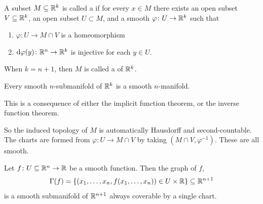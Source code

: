 \begin{definition}
A subset $M\subseteq\mathbb{R}^{k}$ is called a 
if for every $x\in M$ there exists an open subset $V\subseteq\mathbb{R}^{k}$,
an open subset $U\subset M$, and a smooth $\varphi\colon U\to\mathbb{R}^{k}$
such that
\begin{enumerate}
\item $\varphi\colon U\to M\cap V$ is a homeomorphism
\item $\mathrm{d}\varphi(y)\colon\mathbb{R}^{n}\to\mathbb{R}^{k}$ is injective for each
  $y\in U$.
\end{enumerate}
When $k=n+1$, then $M$ is called a  of $\mathbb{R}^{k}$.
\end{definition}

\begin{proposition}
Every smooth $n$-submanifold of $\mathbb{R}^{k}$ is a smooth $n$-manifold.
\end{proposition}

This is a consequence of either the implicit function theorem, or the
inverse function theorem.

\begin{node}
So the induced topology of $M$ is automatically Hausdorff and
second-countable. The charts are formed from $\varphi\colon U\to M\cap V$
by taking $(M\cap V,\varphi^{-1})$. These are all smooth.
\end{node}

\begin{example}
Let $f\colon U\subseteq\mathbb{R}^{n}\to\mathbb{R}$ be a smooth function. Then the
graph of $f$,
\begin{equation}
\Gamma(f)=\{(x_{1},\dots,x_{n},f(x_{1},\dots,x_{n}))\in U\times\mathbb{R}\}\subseteq\mathbb{R}^{n+1}
\end{equation}
is a smooth submanifold of $\mathbb{R}^{n+1}$ always coverable by a single chart.
\end{example}

\endinput